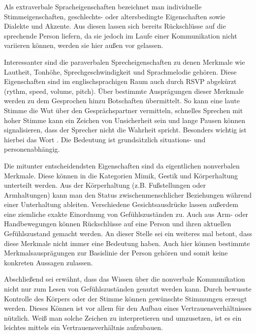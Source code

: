 Als extraverbale Spracheigenschaften bezeichnet man individuelle Stimmeigenschaften, geschlechts- oder altersbedingte Eigenschaften sowie Dialekte und Akzente.
Aus diesen lassen sich bereits Rückschlüsse auf die sprechende Person liefern, da sie jedoch im Laufe einer Kommunikation nicht variieren können, werden sie hier außen vor gelassen.
\citep{grundlagen-der-kommunikation}

Interessanter sind die paraverbalen Sprecheigenschaften zu denen Merkmale wie Lautheit, Tonhöhe, Sprechgeschwindigkeit und Sprachmelodie gehören.
Diese Eigenschaften sind im englischsprachigen Raum auch durch RSVP abgekürzt (rythm, speed, volume, pitch).
Über bestimmte Ausprägungen dieser Merkmale werden zu dem Gesprochen hinzu Botschaften übermittelt.
So kann eine laute Stimme die Wut über den Gesprächspartner vermitteln, schnelles Sprechen mit hoher Stimme kann ein Zeichen von Unsicherheit sein und lange Pausen können signalisieren, dass der Sprecher nicht die Wahrheit spricht.
Besonders wichtig ist hierbei das Wort .
Die Bedeutung ist grundsätzlich situations- und personenabhängig.
\citep{hadnagy}
\citep{grundlagen-der-kommunikation}

Die mitunter entscheidendsten Eigenschaften sind da eigentlichen nonverbalen Merkmale.
Diese können in die Kategorien Mimik, Gestik und Körperhaltung unterteilt werden.
Aus der Körperhaltung (z.B. Fußstellungen oder Armhaltungen) kann man den Status zwischenmenschlicher Beziehungen während einer Unterhaltung ableiten.
Verschiedene Gesichtsausdrücke lassen außerdem eine ziemliche exakte Einordnung von Gefühlszuständen zu.
Auch aus Arm- oder Handbewegungen können Rückschlüsse auf eine Person und ihren aktuellen Gefühlszustand gemacht werden.
An dieser Stelle sei ein weiteres mal betont, dass diese Merkmale nicht immer eine Bedeutung haben.
Auch hier können bestimmte Merkmalsausprägungen zur Basislinie der Person gehören und somit keine konkreten Aussagen zulassen.
\citep{hadnagy}
\citep{grundlagen-der-kommunikation}

Abschließend sei erwähnt, dass das Wissen über die nonverbale Kommunikation nicht nur zum Lesen von Gefühlszuständen genutzt werden kann.
Durch bewusste Kontrolle des Körpers oder der Stimme können gewünschte Stimmungen erzeugt werden.
Dieses Können ist vor allem für den Aufbau eines Vertrauensverhältnisses nützlich.
Weiß man solche Zeichen zu interpretieren und umzusetzen, ist es ein leichtes mittels  ein Vertrauensverhältnis aufzubauen.
\citep{human-hacking}
\citep{hadnagy}
\citep{hacking-the-human}

